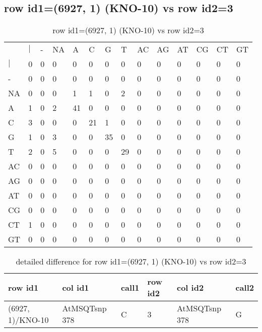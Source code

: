 \subsection{row id1=(6927, 1) (KNO-10) vs row id2=3}
\begin{center}
\begin{longtable}{|l|l|l|l|l|l|l|l|l|l|l|l|l|l|}
\caption{row id1=(6927, 1) (KNO-10) vs row id2=3} \label{table_dm116}\\
\hline
\\
\hline
&$|$&-&NA&A&C&G&T&AC&AG&AT&CG&CT&GT\\
$|$&0&0&0&0&0&0&0&0&0&0&0&0&0\\
-&0&0&0&0&0&0&0&0&0&0&0&0&0\\
NA&0&0&0&1&1&0&2&0&0&0&0&0&0\\
A&1&0&2&41&0&0&0&0&0&0&0&0&0\\
C&3&0&0&0&21&1&0&0&0&0&0&0&0\\
G&1&0&3&0&0&35&0&0&0&0&0&0&0\\
T&2&0&5&0&0&0&29&0&0&0&0&0&0\\
AC&0&0&0&0&0&0&0&0&0&0&0&0&0\\
AG&0&0&0&0&0&0&0&0&0&0&0&0&0\\
AT&0&0&0&0&0&0&0&0&0&0&0&0&0\\
CG&0&0&0&0&0&0&0&0&0&0&0&0&0\\
CT&1&0&0&0&0&0&0&0&0&0&0&0&0\\
GT&0&0&0&0&0&0&0&0&0&0&0&0&0\\
\hline
\end{longtable}
\end{center}

\begin{center}
\begin{longtable}{|l|l|l|l|l|l|}
\caption{detailed difference for row id1=(6927, 1) (KNO-10) vs row id2=3} \label{table_dm117}\\
\hline
row id1&col id1&call1&row id2&col id2&call2\\
\hline
(6927, 1)/KNO-10&AtMSQTsnp 378&C&3&AtMSQTsnp 378&G\\
\hline
\end{longtable}
\end{center}

